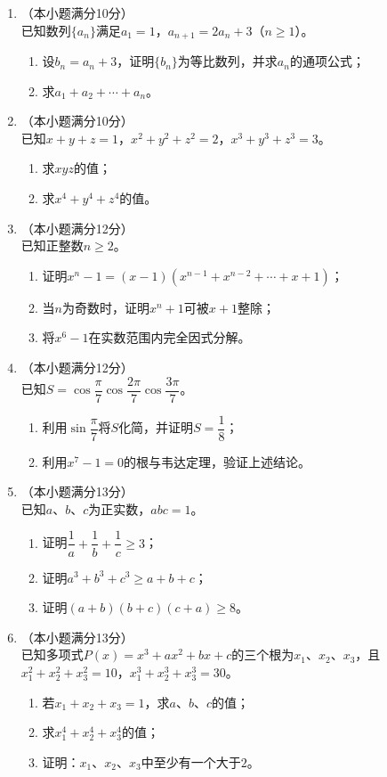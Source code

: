 \documentclass[12pt, a4paper]{ctexart}
\begin{document}
\begin{enumerate}[resume]

\item （本小题满分10分）\\
已知数列$\{a_n\}$满足$a_1=1$，$a_{n+1}=2a_n+3$（$n\geq 1$）。
\begin{enumerate}[(1)]
\item 设$b_n=a_n+3$，证明$\{b_n\}$为等比数列，并求$a_n$的通项公式；
\item 求$a_1+a_2+\cdots+a_n$。
\end{enumerate}

\item （本小题满分10分）\\
已知$x+y+z=1$，$x^2+y^2+z^2=2$，$x^3+y^3+z^3=3$。
\begin{enumerate}[(1)]
\item 求$xyz$的值；
\item 求$x^4+y^4+z^4$的值。
\end{enumerate}

\item （本小题满分12分）\\
已知正整数$n\geq 2$。
\begin{enumerate}[(1)]
\item 证明$x^n-1=(x-1)(x^{n-1}+x^{n-2}+\cdots+x+1)$；
\item 当$n$为奇数时，证明$x^n+1$可被$x+1$整除；
\item 将$x^6-1$在实数范围内完全因式分解。
\end{enumerate}

\item （本小题满分12分）\\
已知$S=\cos\dfrac{\pi}{7}\cos\dfrac{2\pi}{7}\cos\dfrac{3\pi}{7}$。
\begin{enumerate}[(1)]
\item 利用$\sin\dfrac{\pi}{7}$将$S$化简，并证明$S=\dfrac{1}{8}$；
\item 利用$x^7-1=0$的根与韦达定理，验证上述结论。
\end{enumerate}

\item （本小题满分13分）\\
已知$a$、$b$、$c$为正实数，$abc=1$。
\begin{enumerate}[(1)]
\item 证明$\dfrac{1}{a}+\dfrac{1}{b}+\dfrac{1}{c}\geq 3$；
\item 证明$a^3+b^3+c^3\geq a+b+c$；
\item 证明$(a+b)(b+c)(c+a)\geq 8$。
\end{enumerate}

\item （本小题满分13分）\\
已知多项式$P(x)=x^3+ax^2+bx+c$的三个根为$x_1$、$x_2$、$x_3$，且$x_1^2+x_2^2+x_3^2=10$，$x_1^3+x_2^3+x_3^3=30$。
\begin{enumerate}[(1)]
\item 若$x_1+x_2+x_3=1$，求$a$、$b$、$c$的值；
\item 求$x_1^4+x_2^4+x_3^4$的值；
\item 证明：$x_1$、$x_2$、$x_3$中至少有一个大于$2$。
\end{enumerate}

\end{enumerate}
\end{document}
